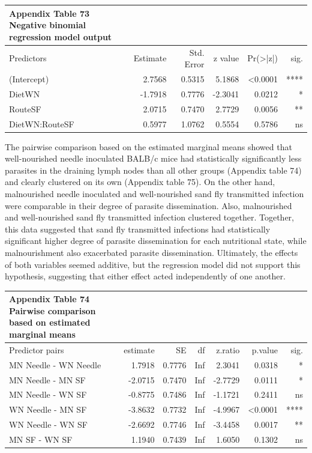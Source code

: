 \documentclass[
  12pt,
  letterpaper,
]{article}
\begin{document}
\begin{longtable}{l|rrrrr}
\caption*{
{\large \textbf{Appendix Table 73}} \\ 
{\small \textbf{Negative binomial regression model output}}
} \\ 
\toprule
\multicolumn{1}{l}{Predictors} & Estimate & Std. Error & z value & Pr(>|z|) & sig. \\ 
\midrule\addlinespace[2.5pt]
(Intercept) & 2.7568 & 0.5315 & 5.1868 & <0.0001 & **** \\ 
DietWN & -1.7918 & 0.7776 & -2.3041 & 0.0212 & * \\ 
RouteSF & 2.0715 & 0.7470 & 2.7729 & 0.0056 & ** \\ 
DietWN:RouteSF & 0.5977 & 1.0762 & 0.5554 & 0.5786 & ns \\ 
\bottomrule
\end{longtable}

The pairwise comparison based on the estimated marginal means showed that well-nourished needle inoculated BALB/c mice had statistically significantly less parasites in the draining lymph nodes than all other groups (Appendix table 74) and clearly clustered on its own (Appendix table 75). On the other hand, malnourished needle inoculated and well-nourished sand fly transmitted infection were comparable in their degree of parasite dissemination. Also, malnourished and well-nourished sand fly transmitted infection clustered together. Together, this data suggested that sand fly transmitted infections had statistically significant higher degree of parasite dissemination for each nutritional state, while malnourishment also exacerbated parasite dissemination. Ultimately, the effects of both variables seemed additive, but the regression model did not support this hypothesis, suggesting that either effect acted independently of one another.

\begin{longtable}{l|rrrrrr}
\caption*{
{\large \textbf{Appendix Table 74}} \\ 
{\small \textbf{Pairwise comparison based on estimated marginal means}}
} \\ 
\toprule
\multicolumn{1}{l}{Predictor pairs} & estimate & SE & df & z.ratio & p.value & sig. \\ 
\midrule\addlinespace[2.5pt]
MN Needle - WN Needle & 1.7918 & 0.7776 & Inf & 2.3041 & 0.0318 & * \\ 
MN Needle - MN SF & -2.0715 & 0.7470 & Inf & -2.7729 & 0.0111 & * \\ 
MN Needle - WN SF & -0.8775 & 0.7486 & Inf & -1.1721 & 0.2411 & ns \\ 
WN Needle - MN SF & -3.8632 & 0.7732 & Inf & -4.9967 & <0.0001 & **** \\ 
WN Needle - WN SF & -2.6692 & 0.7746 & Inf & -3.4458 & 0.0017 & ** \\ 
MN SF - WN SF & 1.1940 & 0.7439 & Inf & 1.6050 & 0.1302 & ns \\ 
\bottomrule
\end{longtable}
\end{document}

